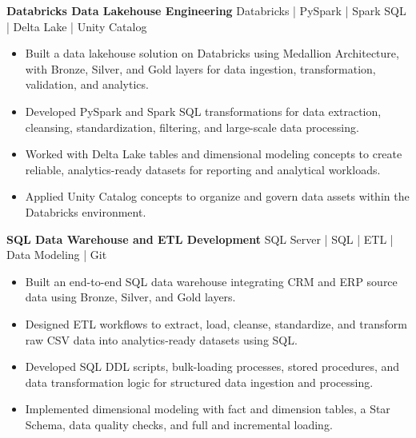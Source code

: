 \documentclass[10pt,a4paper]{article}
\newcommand{\resumeItem}[1]{
    \item \small{#1}
}
\newcommand{\projectHeading}[2]{
    \textbf{#1} \hfill {\small #2}\\[-2pt]
}
\begin{document}
\vspace{4pt}


\projectHeading
{Databricks Data Lakehouse Engineering}
{Databricks | PySpark | Spark SQL | Delta Lake | Unity Catalog}

\begin{itemize}

\resumeItem{Built a data lakehouse solution on Databricks using Medallion Architecture, with Bronze, Silver, and Gold layers for data ingestion, transformation, validation, and analytics.}

\resumeItem{Developed PySpark and Spark SQL transformations for data extraction, cleansing, standardization, filtering, and large-scale data processing.}

\resumeItem{Worked with Delta Lake tables and dimensional modeling concepts to create reliable, analytics-ready datasets for reporting and analytical workloads.}

\resumeItem{Applied Unity Catalog concepts to organize and govern data assets within the Databricks environment.}

\vspace{4pt}

\end{itemize}



\projectHeading
{SQL Data Warehouse and ETL Development}
{SQL Server | SQL | ETL | Data Modeling | Git}

\begin{itemize}

\resumeItem{Built an end-to-end SQL data warehouse integrating CRM and ERP source data using Bronze, Silver, and Gold layers.}

\resumeItem{Designed ETL workflows to extract, load, cleanse, standardize, and transform raw CSV data into analytics-ready datasets using SQL.}

\resumeItem{Developed SQL DDL scripts, bulk-loading processes, stored procedures, and data transformation logic for structured data ingestion and processing.}

\resumeItem{Implemented dimensional modeling with fact and dimension tables, a Star Schema, data quality checks, and full and incremental loading.}

\vspace{4pt}

\end{itemize}
\end{document}
